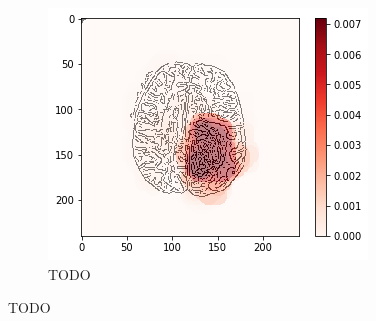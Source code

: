 \begin{figure}[H]
\begin{subfigure}{.33\textwidth}
        \centering
        \includegraphics[width=\linewidth]{chapters/06_hdm/circle20/13.png}
        \caption{TODO}
    \end{subfigure}
    \caption{TODO}
\end{figure}

